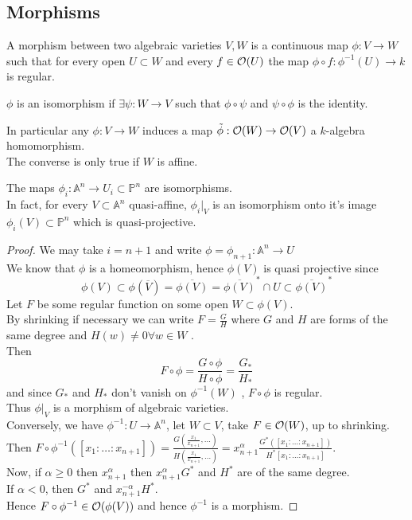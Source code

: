 \documentclass[../main.tex]{subfiles}
\begin{document}
\subsection{Morphisms}
\begin{defn}[Morphism]
	A morphism between two algebraic varieties $V,W$ is a continuous map $\phi:V\to W$ such that for every open $U \subset W$ and every $f\in \mathcal{O}( U) $ the map $\phi\circ f :\phi^{-1}( U) \to k$ is regular.
\end{defn}
$\phi$ is an isomorphism if $\exists  \psi: W\to V $ such that $ \phi\circ\psi$ and $\psi\circ\phi$ is the identity.
\begin{rmq}
In particular any $\phi:V\to W$ induces a map $\tilde { \phi} : \mathcal{O} ( W) \to \mathcal{O}( V) $ a $k$-algebra homomorphism.\\
The converse is only true if $W$ is affine.
\end{rmq}
\begin{propo}
The maps $\phi_i: \mathbb{A}^{n}\to U_i \subset \mathbb{P}^{n}$ are isomorphisms.\\
In fact, for every $ V \subset \mathbb{A}^{n}$ quasi-affine, $\phi_i |_V$ is an isomorphism onto it's image $\phi_i( V) \subset \mathbb{P}^{n}$ which is quasi-projective. 
\end{propo}
\begin{proof}
We may take $i= n+1$ and write $\phi= \phi_{n+1} : \mathbb{A}^{n}\to U$\\
We know that $\phi$ is a homeomorphism, hence $\phi( V) $ is quasi projective since
\[ 
\phi( V) \subset \phi( \overline{V}) = \overline { \phi( V) } = \overline { \phi( V) }^{\ast} \cap U \subset \overline{  \phi( V)  } ^{\ast}
\]
Let $F$ be some regular function on some open $W \subset \phi( V) $.\\
By shrinking if necessary we can write $F= \frac{G}{H}$ where $G$ and $H$ are forms of the same degree and $H( w) \neq 0 \forall w \in W$ .\\
Then
\[ 
F\circ\phi = \frac{G\circ\phi}{H\circ\phi} = \frac{G_\ast}{H_\ast}
\]
and since $G_\ast$ and $H_{\ast} $ don't vanish on $\phi^{-1}( W) $ , $F\circ\phi$ is regular.\\
Thus $\phi|_V$ is a morphism of algebraic varieties.\\
Conversely, we have $\phi^{-1}: U\to \mathbb{A}^{n}$, let $W \subset V$, take $F\in \mathcal{O}( W) $, up to shrinking.\\
Then $F\circ\phi^{-1} ( [ x_1:\ldots:x_{n+1} ] ) = \frac{G( \frac{x_1}{x_{n+1} },\ldots) }{H( \frac{x_1}{x_{n+1} },\ldots) }= x_{n+1}^{\alpha}	\frac{ G^{\ast}( [ x_1:\ldots:x_{n+1} ] ) } { H^{\ast}[x_1:\ldots:x_{n+1} ]} $.\\
Now, if $\alpha \geq 0$ then $x_{n+1}^{\alpha}$ then $x_{n+1} ^{\alpha} G^{\ast}$ and $H^{\ast}$ are of the same degree.\\
If $\alpha< 0$, then $G^{\ast}$ and $x_{n+1}^{-\alpha}H^{\ast}$.\\
Hence $F\circ\phi^{-1}\in \mathcal{O} ( \phi( V) ) $ and hence $\phi^{-1}$ is a morphism.
\end{proof}
\end{document}

